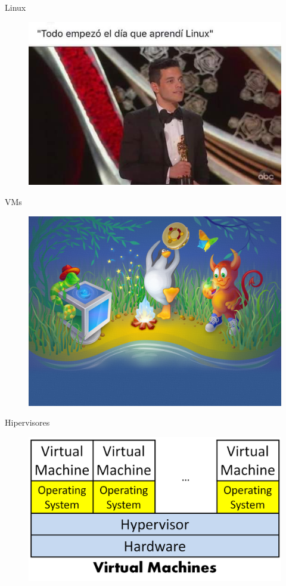 \documentclass[aspectratio=169]{beamer}
\begin{document}
\begin{frame}{Linux}
    \begin{figure}
        \centering
        \includegraphics[width=0.6\linewidth]{Images/linux}
        \label{fig:linux}
    \end{figure}
\end{frame}

\begin{frame}{VMs}
    \begin{figure}
        \centering
        \includegraphics[width=0.6\linewidth]{Images/virtualbox}
        \label{fig:vm}
    \end{figure}
\end{frame}


\begin{frame}{Hipervisores}
    \begin{figure}
        \centering
        \includegraphics[width=0.6\linewidth]{Images/hypervisors}
        \label{fig:hypervisors}
    \end{figure}
\end{frame}
\end{document}
